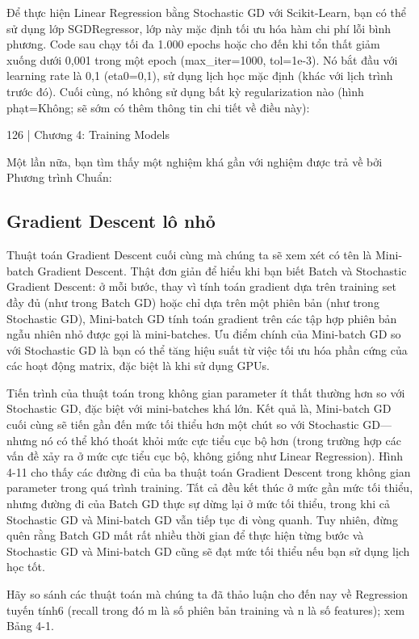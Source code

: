 Để thực hiện Linear Regression bằng Stochastic GD với Scikit-Learn, bạn có thể sử dụng lớp SGDRegressor, lớp này mặc định tối ưu hóa hàm chi phí lỗi bình phương. Code sau chạy tối đa 1.000 epochs hoặc cho đến khi tổn thất giảm xuống dưới 0,001 trong một epoch (max\_iter=1000, tol=1e-3). Nó bắt đầu với learning rate là 0,1 (eta0=0,1), sử dụng lịch học mặc định (khác với lịch trình trước đó). Cuối cùng, nó không sử dụng bất kỳ regularization nào (hình phạt=Không; sẽ sớm có thêm thông tin chi tiết về điều này):

126 | Chương 4: Training Models

Một lần nữa, bạn tìm thấy một nghiệm khá gần với nghiệm được trả về bởi Phương trình Chuẩn:

\subsection{Gradient Descent lô nhỏ}

Thuật toán Gradient Descent cuối cùng mà chúng ta sẽ xem xét có tên là Mini-batch Gradient Descent. Thật đơn giản để hiểu khi bạn biết Batch và Stochastic Gradient Descent: ở mỗi bước, thay vì tính toán gradient dựa trên training set đầy đủ (như trong Batch GD) hoặc chỉ dựa trên một phiên bản (như trong Stochastic GD), Mini-batch GD tính toán gradient trên các tập hợp phiên bản ngẫu nhiên nhỏ được gọi là mini-batches. Ưu điểm chính của Mini-batch GD so với Stochastic GD là bạn có thể tăng hiệu suất từ ​​việc tối ưu hóa phần cứng của các hoạt động matrix, đặc biệt là khi sử dụng GPUs.

Tiến trình của thuật toán trong không gian parameter ít thất thường hơn so với Stochastic GD, đặc biệt với mini-batches khá lớn. Kết quả là, Mini-batch GD cuối cùng sẽ tiến gần đến mức tối thiểu hơn một chút so với Stochastic GD—nhưng nó có thể khó thoát khỏi mức cực tiểu cục bộ hơn (trong trường hợp các vấn đề xảy ra ở mức cực tiểu cục bộ, không giống như Linear Regression). Hình 4-11 cho thấy các đường đi của ba thuật toán Gradient Descent trong không gian parameter trong quá trình training. Tất cả đều kết thúc ở mức gần mức tối thiểu, nhưng đường đi của Batch GD thực sự dừng lại ở mức tối thiểu, trong khi cả Stochastic GD và Mini-batch GD vẫn tiếp tục đi vòng quanh. Tuy nhiên, đừng quên rằng Batch GD mất rất nhiều thời gian để thực hiện từng bước và Stochastic GD và Mini-batch GD cũng sẽ đạt mức tối thiểu nếu bạn sử dụng lịch học tốt.

Hãy so sánh các thuật toán mà chúng ta đã thảo luận cho đến nay về Regression tuyến tính6 (recall trong đó m là số phiên bản training và n là số features); xem Bảng 4-1.

